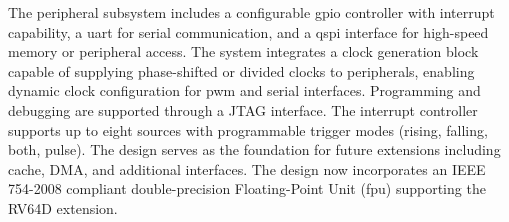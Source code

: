 The peripheral subsystem includes a configurable \gls{gpio} controller with
interrupt capability, a \gls{uart} for serial communication, and a \gls{qspi}
interface for high-speed memory or peripheral access. The system integrates a
clock generation block capable of supplying phase-shifted or divided clocks to
peripherals, enabling dynamic clock configuration for \gls{pwm} and serial
interfaces. Programming and debugging are supported through a JTAG interface.
The interrupt controller supports up to eight sources with programmable trigger
modes (rising, falling, both, pulse). The design serves as the foundation for
future extensions including cache, DMA, and additional interfaces. The design
now incorporates an IEEE 754-2008 compliant double-precision Floating-Point
Unit (\gls{fpu}) supporting the RV64D extension.

